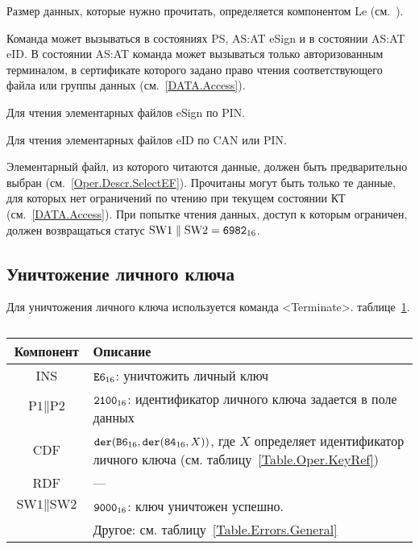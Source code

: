 Размер данных, которые нужно прочитать, определяется компонентом 
Le (см.~\cite{APDU}).

Команда может вызываться в состояниях PS, AS:AT 
 eSign и в состоянии AS:AT  eID.
В состоянии AS:AT команда может вызываться только 
авторизованным терминалом, в сертификате которого
задано право чтения соответствующего файла или группы данных
(см.~\ref{DATA.Access}).

Для чтения элементарных файлов  eSign 
 по PIN.

Для чтения элементарных файлов  eID 
 по CAN или PIN.

Элементарный файл, из которого читаются данные, должен быть предварительно 
выбран (см.~\ref{Oper.Descr.SelectEF}). Прочитаны могут быть только те данные, 
для которых нет ограничений по чтению при текущем состоянии КТ (см.~\ref{DATA.Access}). 
При попытке чтения данных, доступ к которым ограничен, должен возвращаться 
статус $\text{SW1} \parallel \text{SW2} = \texttt{6982}_{16}$.

\subsection{Уничтожение личного ключа}
\label{Oper.Descr.Terminate}

Для уничтожения личного ключа используется команда <Terminate>.
 таблице~\ref{Table.Oper.TerminateCmd}.

\begin{table}[ht]
\caption{}\label{Table.Oper.TerminateCmd}
\begin{tabular}{|c|p{14cm}|}
\hline
Компонент & Описание\\
\hline
\hline
INS & $\texttt{E6}_{16}$: уничтожить личный ключ \\
\hline
$\text{P1} \parallel\text{P2}$ & $\texttt{2100}_{16}$:
идентификатор личного ключа задается в поле данных\\
\hline
CDF &  $\texttt{der}(\texttt{B6}_{16},\texttt{der}(\texttt{84}_{16}, X))$,
где $X$ определяет идентификатор личного ключа
(см. таблицу~\ref{Table.Oper.KeyRef})\\ 
\hline 
RDF & ---  \\
\hline
$\text{SW1} \parallel \text{SW2}$ & 
$\texttt{9000}_{16}$: ключ уничтожен успешно.\\
 & Другое: см. таблицу~\ref{Table.Errors.General} \\
\hline
\end{tabular}
\end{table}

